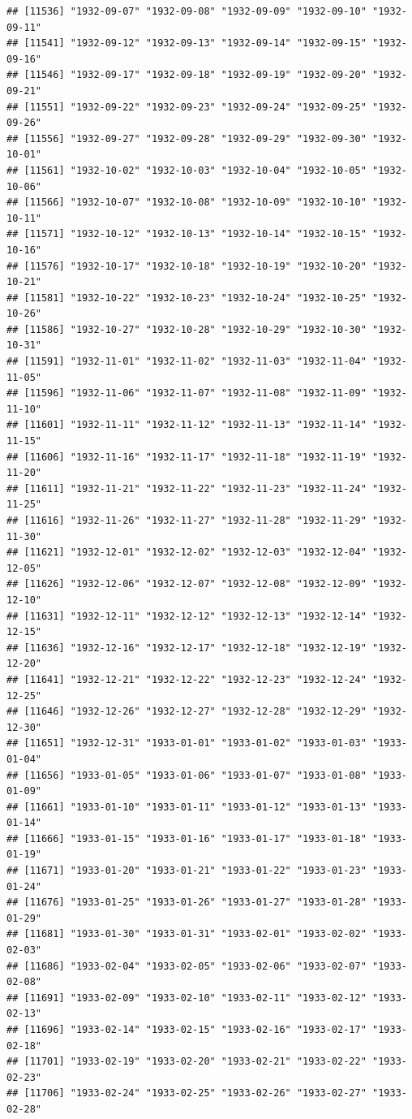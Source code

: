 \documentclass{article}\usepackage[]{graphicx}\usepackage[]{color}
\makeatletter
\newenvironment{kframe}{%
 \def\at@end@of@kframe{}%
 \ifinner\ifhmode%
  \def\at@end@of@kframe{\end{minipage}}%
  \begin{minipage}{\columnwidth}%
 \fi\fi%
 \def\FrameCommand##1{\hskip\@totalleftmargin \hskip-\fboxsep
 \colorbox{shadecolor}{##1}\hskip-\fboxsep
     \hskip-\linewidth \hskip-\@totalleftmargin \hskip\columnwidth}%
 \MakeFramed {\advance\hsize-\width
   \@totalleftmargin\z@ \linewidth\hsize
   \@setminipage}}%
 {\par\unskip\endMakeFramed%
 \at@end@of@kframe}
\newenvironment{knitrout}{}{} %
\makeatother
\begin{document}
\begin{description}
\begin{knitrout}
\begin{kframe}
\begin{verbatim}
## [11536] "1932-09-07" "1932-09-08" "1932-09-09" "1932-09-10" "1932-09-11"
## [11541] "1932-09-12" "1932-09-13" "1932-09-14" "1932-09-15" "1932-09-16"
## [11546] "1932-09-17" "1932-09-18" "1932-09-19" "1932-09-20" "1932-09-21"
## [11551] "1932-09-22" "1932-09-23" "1932-09-24" "1932-09-25" "1932-09-26"
## [11556] "1932-09-27" "1932-09-28" "1932-09-29" "1932-09-30" "1932-10-01"
## [11561] "1932-10-02" "1932-10-03" "1932-10-04" "1932-10-05" "1932-10-06"
## [11566] "1932-10-07" "1932-10-08" "1932-10-09" "1932-10-10" "1932-10-11"
## [11571] "1932-10-12" "1932-10-13" "1932-10-14" "1932-10-15" "1932-10-16"
## [11576] "1932-10-17" "1932-10-18" "1932-10-19" "1932-10-20" "1932-10-21"
## [11581] "1932-10-22" "1932-10-23" "1932-10-24" "1932-10-25" "1932-10-26"
## [11586] "1932-10-27" "1932-10-28" "1932-10-29" "1932-10-30" "1932-10-31"
## [11591] "1932-11-01" "1932-11-02" "1932-11-03" "1932-11-04" "1932-11-05"
## [11596] "1932-11-06" "1932-11-07" "1932-11-08" "1932-11-09" "1932-11-10"
## [11601] "1932-11-11" "1932-11-12" "1932-11-13" "1932-11-14" "1932-11-15"
## [11606] "1932-11-16" "1932-11-17" "1932-11-18" "1932-11-19" "1932-11-20"
## [11611] "1932-11-21" "1932-11-22" "1932-11-23" "1932-11-24" "1932-11-25"
## [11616] "1932-11-26" "1932-11-27" "1932-11-28" "1932-11-29" "1932-11-30"
## [11621] "1932-12-01" "1932-12-02" "1932-12-03" "1932-12-04" "1932-12-05"
## [11626] "1932-12-06" "1932-12-07" "1932-12-08" "1932-12-09" "1932-12-10"
## [11631] "1932-12-11" "1932-12-12" "1932-12-13" "1932-12-14" "1932-12-15"
## [11636] "1932-12-16" "1932-12-17" "1932-12-18" "1932-12-19" "1932-12-20"
## [11641] "1932-12-21" "1932-12-22" "1932-12-23" "1932-12-24" "1932-12-25"
## [11646] "1932-12-26" "1932-12-27" "1932-12-28" "1932-12-29" "1932-12-30"
## [11651] "1932-12-31" "1933-01-01" "1933-01-02" "1933-01-03" "1933-01-04"
## [11656] "1933-01-05" "1933-01-06" "1933-01-07" "1933-01-08" "1933-01-09"
## [11661] "1933-01-10" "1933-01-11" "1933-01-12" "1933-01-13" "1933-01-14"
## [11666] "1933-01-15" "1933-01-16" "1933-01-17" "1933-01-18" "1933-01-19"
## [11671] "1933-01-20" "1933-01-21" "1933-01-22" "1933-01-23" "1933-01-24"
## [11676] "1933-01-25" "1933-01-26" "1933-01-27" "1933-01-28" "1933-01-29"
## [11681] "1933-01-30" "1933-01-31" "1933-02-01" "1933-02-02" "1933-02-03"
## [11686] "1933-02-04" "1933-02-05" "1933-02-06" "1933-02-07" "1933-02-08"
## [11691] "1933-02-09" "1933-02-10" "1933-02-11" "1933-02-12" "1933-02-13"
## [11696] "1933-02-14" "1933-02-15" "1933-02-16" "1933-02-17" "1933-02-18"
## [11701] "1933-02-19" "1933-02-20" "1933-02-21" "1933-02-22" "1933-02-23"
## [11706] "1933-02-24" "1933-02-25" "1933-02-26" "1933-02-27" "1933-02-28"

\end{verbatim}
\end{kframe}
\end{knitrout}
\end{description}
\end{document}
